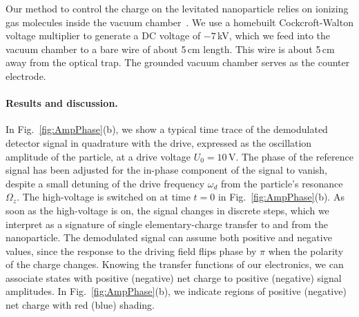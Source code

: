 \documentclass[aps,amssymb,amsmath,pra,reprint,noshowpacs]{revtex4-1}
\begin{document}
Our method to control the charge on the levitated nanoparticle relies on ionizing gas molecules inside the vacuum chamber~\cite{Schonenberger1990}. We use a homebuilt Cockcroft-Walton voltage multiplier to generate a DC voltage of $-7$\,kV, which we feed into the vacuum chamber to a bare wire of about 5\,cm length. This wire is about 5\,cm away from the optical trap. The grounded vacuum chamber serves as the counter electrode.

\paragraph{Results and discussion.} In Fig.~\ref{fig:AmpPhase}(b), we show a typical time trace of the demodulated detector signal in quadrature with the drive, expressed as the oscillation amplitude of the particle, at a drive voltage $U_0=10$\,V\@. The phase of the reference signal has been adjusted for the in-phase component of the signal to vanish, despite a small detuning of the drive frequency $\omega_d$ from the particle's resonance $\Omega_z$. The high-voltage is switched on at time $t=0$ in Fig.~\ref{fig:AmpPhase}(b). As soon as the high-voltage is on, the signal changes in discrete steps, which we interpret as a signature of single elementary-charge transfer to and from the nanoparticle.
The demodulated signal can assume both positive and negative values, since the response to the driving field flips phase by $\pi$ when the polarity of the charge changes. Knowing the transfer functions of our electronics, we can associate states with positive (negative) net charge to positive (negative) signal amplitudes. In Fig.~\ref{fig:AmpPhase}(b), we indicate regions of positive (negative) net charge with red (blue) shading.
\end{document}
